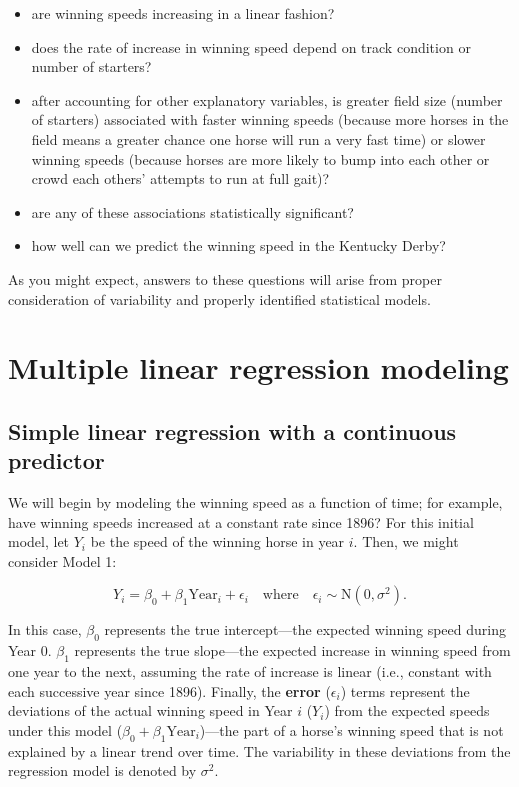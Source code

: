 \documentclass[
]{krantz}
\providecommand{\tightlist}{%
  \setlength{\itemsep}{0pt}\setlength{\parskip}{0pt}}
\begin{document}
\begin{itemize}
\tightlist
\item
  are winning speeds increasing in a linear fashion?
\item
  does the rate of increase in winning speed depend on track condition or number of starters?
\item
  after accounting for other explanatory variables, is greater field size (number of starters) associated with faster winning speeds (because more horses in the field means a greater chance one horse will run a very fast time) or slower winning speeds (because horses are more likely to bump into each other or crowd each others' attempts to run at full gait)?
\item
  are any of these associations statistically significant?
\item
  how well can we predict the winning speed in the Kentucky Derby?
\end{itemize}

As you might expect, answers to these questions will arise from proper consideration of variability and properly identified statistical models.

\hypertarget{multreg}{%
\section{Multiple linear regression modeling}\label{multreg}}

\hypertarget{SLRcontinuous}{%
\subsection{Simple linear regression with a continuous predictor}\label{SLRcontinuous}}

We will begin by modeling the winning speed as a function of time; for example, have winning speeds increased at a constant rate since 1896? For this initial model, let \(Y_{i}\) be the speed of the winning horse in year \(i\). Then, we might consider Model 1:

\begin{equation}
 Y_{i}=\beta_{0}+\beta_{1}\textrm{Year}_{i}+\epsilon_{i} \quad \textrm{where} \quad \epsilon_{i}\sim \textrm{N}(0,\sigma^2).
\label{eq:model1}
\end{equation}

In this case, \(\beta_{0}\) represents the true intercept---the expected winning speed during Year 0. \(\beta_{1}\) represents the true slope---the expected increase in winning speed from one year to the next, assuming the rate of increase is linear (i.e., constant with each successive year since 1896). Finally, the \textbf{error} (\(\epsilon_{i}\))  terms represent the deviations of the actual winning speed in Year \(i\) (\(Y_i\)) from the expected speeds under this model (\(\beta_{0}+\beta_{1}\textrm{Year}_{i}\))---the part of a horse's winning speed that is not explained by a linear trend over time. The variability in these deviations from the regression model is denoted by \(\sigma^2\).
\end{document}
